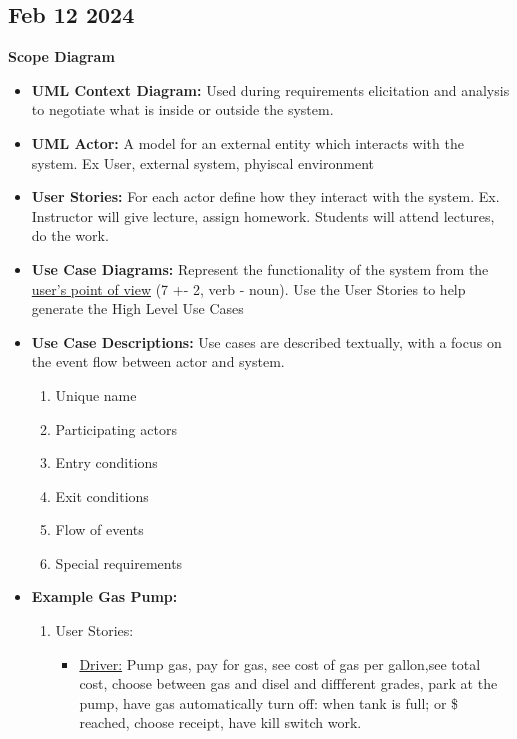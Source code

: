 \documentclass[12pt]{article}
\begin{document}
\subsection*{Feb 12 2024}

\textbf{Scope Diagram}

\begin{itemize}
		  \item \textbf{UML Context Diagram:} Used during requirements elicitation and analysis
					 to negotiate what is inside or outside the system. 
		  \item \textbf{UML Actor:} A model for an external entity which interacts with the system. Ex
					 User, external system, phyiscal environment
		  \item \textbf{User Stories:} For each actor define how they interact with the system. Ex. Instructor
					 will give lecture, assign homework. Students will attend lectures, do the work. 
		  \item \textbf{Use Case Diagrams:} Represent the functionality of the system from the 
					 \underline{user's point of view} (7 +- 2, verb - noun). Use the User Stories to help
					 generate the High Level Use Cases
		  \item \textbf{Use Case Descriptions:} Use cases are described textually, with a focus 
					 on the event flow between actor and system.
					 \begin{enumerate}
								\item Unique name
								\item Participating actors
								\item Entry conditions
								\item Exit conditions
								\item Flow of events
								\item Special requirements
					 \end{enumerate}
		  \item \textbf{Example Gas Pump:}
					 \begin{enumerate}
								\item User Stories:
										  \begin{itemize}
													 \item \underline{Driver:} Pump gas, pay for gas, see cost of gas per 
																gallon,see total cost, choose between gas and disel and diffferent
																grades, park at the pump, have gas automatically turn off:
																when tank is full; or \$ reached, choose receipt, have 
																kill switch work.

\end{itemize}
\end{enumerate}
\end{itemize}
\end{document}
